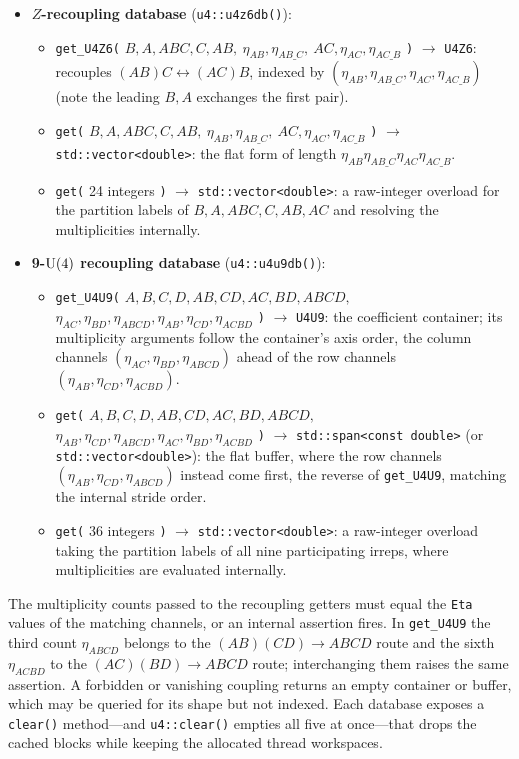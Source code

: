 \documentclass[aps,onecolumn,10pt,superscriptaddress,floatfix,nofootinbib]{revtex4}
\begin{document}
\begin{itemize}
    \item \textbf{$Z$-recoupling database} (\verb|u4::u4z6db()|):
    \begin{itemize}
        \item \verb|get_U4Z6(| $B,A,ABC,C,AB,\ \eta_{AB},\eta_{AB\_C},\ AC,\eta_{AC},\eta_{AC\_B}$ \verb|)| $\to$ \verb|U4Z6|: recouples $(AB)C\leftrightarrow(AC)B$, indexed by $(\eta_{AB},\eta_{AB\_C},\eta_{AC},\eta_{AC\_B})$ (note the leading $B,A$ exchanges the first pair).
        \item \verb|get(| $B,A,ABC,C,AB,\ \eta_{AB},\eta_{AB\_C},\ AC,\eta_{AC},\eta_{AC\_B}$ \verb|)| $\to$ \verb|std::vector<double>|: the flat form of length $\eta_{AB}\eta_{AB\_C}\eta_{AC}\eta_{AC\_B}$.
        \item \verb|get(| 24 integers \verb|)| $\to$ \verb|std::vector<double>|: a raw-integer overload for the partition labels of $B,A,ABC,C,AB,AC$ and resolving the multiplicities internally.
    \end{itemize}

    \item \textbf{9-$\rm U(4)$ recoupling database} (\verb|u4::u4u9db()|):
    \begin{itemize}
        \item \verb|get_U4U9(| $A,B,C,D,AB,CD,AC,BD,ABCD,$ $\eta_{AC},\eta_{BD},\eta_{ABCD},\eta_{AB},\eta_{CD},\eta_{ACBD}$ \verb|)| $\to$ \verb|U4U9|: the coefficient container; its multiplicity arguments follow the container's axis order, the column channels $(\eta_{AC},\eta_{BD},\eta_{ABCD})$ ahead of the row channels $(\eta_{AB},\eta_{CD},\eta_{ACBD})$.
        \item \verb|get(| $A,B,C,D,AB,CD,AC,BD,ABCD,$ $\eta_{AB},\eta_{CD},\eta_{ABCD},\eta_{AC},\eta_{BD},\eta_{ACBD}$ \verb|)| $\to$ \verb|std::span<const double>| (or \verb|std::vector<double>|): the flat buffer, where the row channels $(\eta_{AB},\eta_{CD},\eta_{ABCD})$ instead come first, the reverse of \verb|get_U4U9|, matching the internal stride order.
        \item \verb|get(| 36 integers \verb|)| $\to$ \verb|std::vector<double>|: a raw-integer overload taking the partition labels of all nine participating irreps, where multiplicities are evaluated internally.
    \end{itemize}
\end{itemize}

The multiplicity counts passed to the recoupling getters must equal the
\verb|Eta| values of the matching channels, or an internal assertion fires. In
\verb|get_U4U9| the third count $\eta_{ABCD}$ belongs to the
$(AB)(CD)\to ABCD$ route and the sixth $\eta_{ACBD}$ to the
$(AC)(BD)\to ABCD$ route; interchanging them raises the same assertion. A
forbidden or vanishing coupling returns an empty container or buffer, which may
be queried for its shape but not indexed. Each database exposes a \verb|clear()|
method---and \verb|u4::clear()| empties all five at once---that drops the cached
blocks while keeping the allocated thread workspaces.
\end{document}
